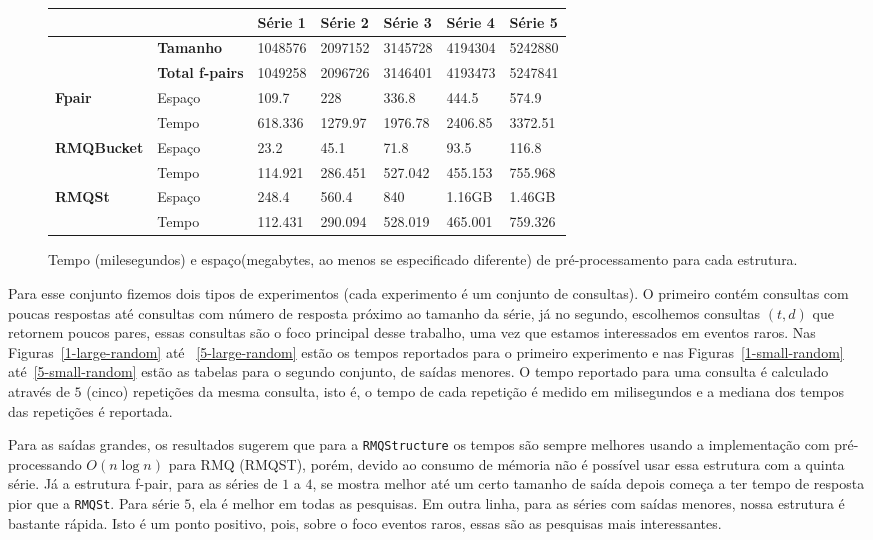 \documentclass[12pt]{article}
\begin{document}
\begin{figure}
\begin{center}
\begin{tabular}{|l|l|l|l|l|l|l|}
\hline
      &    & Série 1 & Série 2 & Série 3 & Série 4 & Série 5 \\
\hline
			& \textbf{Tamanho}  & 1048576 & 2097152  & 3145728  & 4194304  & 5242880 \\
\hline
			& \textbf{Total f-pairs}  & 1049258 & 2096726   & 3146401  & 4193473  & 5247841 \\
\hline
\multirow{2}{*}{\textbf{Fpair}} & Espaço & 109.7 & 228 & 336.8 & 444.5 & 574.9\\
                                & Tempo & 618.336 & 1279.97 & 1976.78 & 2406.85 & 3372.51\\
\hline
\multirow{2}{*}{\textbf{RMQBucket}} & Espaço & 23.2 & 45.1 & 71.8 & 93.5 & 116.8\\
													          & Tempo & 114.921 & 286.451 & 527.042 & 455.153 & 755.968\\
\hline
\multirow{2}{*}{\textbf{RMQSt}} & Espaço & 248.4 & 560.4 & 840 & 1.16GB & 1.46GB \\
											          & Tempo & 112.431 & 290.094 & 528.019 & 465.001 & 759.326\\
\hline
\end{tabular}
\caption{Tempo (milesegundos) e espaço(megabytes, ao menos se especificado diferente) de pré-processamento para cada estrutura.}
\label{pre-random}
\end{center}
\end{figure}



Para esse conjunto fizemos dois tipos de experimentos (cada experimento é um conjunto de consultas).
O primeiro contém consultas com poucas respostas até consultas com número de resposta próximo
ao tamanho da série, já no segundo,  escolhemos consultas $(t, d)$ que retornem poucos pares, essas
consultas são o foco principal desse trabalho, uma vez que estamos interessados
em eventos raros. Nas Figuras~\ref{1-large-random} até ~\ref{5-large-random} estão
os tempos reportados para o primeiro experimento e nas Figuras~\ref{1-small-random} até~\ref{5-small-random}
estão as tabelas para o segundo conjunto, de saídas menores. 
O tempo reportado para uma consulta é calculado através de $5$ (cinco) repetições da mesma
consulta, isto é, o tempo de cada repetição é medido em milisegundos e a mediana dos tempos
das repetições é reportada.

Para as saídas grandes, os resultados sugerem que para a \verb|RMQStructure| os tempos são sempre melhores usando a implementação
com pré-processando $O(n \log n)$ para RMQ (RMQST), porém, devido ao consumo de mémoria não é possível
usar essa estrutura com a quinta série. Já a estrutura f-pair, para as séries de $1$ a $4$, se mostra melhor
até um certo tamanho de saída depois começa a ter tempo de resposta pior que a \verb|RMQSt|. Para série $5$,
ela é melhor em todas as pesquisas. Em outra linha, para as séries com saídas menores, nossa estrutura é bastante rápida.
Isto é um ponto positivo, pois, sobre o foco eventos raros, essas são as pesquisas mais interessantes.
\end{document}

